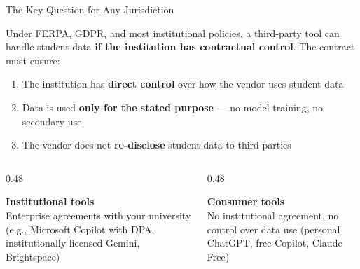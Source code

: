 \documentclass[aspectratio=169, 10pt]{beamer}
\begin{document}
\begin{frame}{The Key Question for Any Jurisdiction}

\begin{tcolorbox}[keybox, title={\faUniversity\quad Does Your Institution Have an Agreement with the AI Vendor?}]
\footnotesize
Under FERPA, GDPR, and most institutional policies, a third-party tool can handle student data \textbf{if the institution has contractual control}. The contract must ensure:
\begin{enumerate}\footnotesize
  \item The institution has \textbf{direct control} over how the vendor uses student data
  \item Data is used \textbf{only for the stated purpose} --- no model training, no secondary use
  \item The vendor does not \textbf{re-disclose} student data to third parties
\end{enumerate}
\end{tcolorbox}

\vspace{0.1cm}

\begin{columns}[T]
\begin{column}{0.48\textwidth}
\begin{tcolorbox}[accentbox]
\faCheckCircle\;\textbf{Institutional tools}\\[3pt]
\footnotesize Enterprise agreements with your university (e.g., Microsoft Copilot with DPA, institutionally licensed Gemini, Brightspace)
\end{tcolorbox}
\end{column}

\begin{column}{0.48\textwidth}
\begin{tcolorbox}[colback=SoftCoral!10, colframe=SoftCoral, boxrule=0.8pt, arc=3pt, left=6pt, right=6pt, top=4pt, bottom=4pt]
\faTimesCircle\;\textbf{Consumer tools}\\[3pt]
\footnotesize No institutional agreement, no control over data use (personal ChatGPT, free Copilot, Claude Free)
\end{tcolorbox}
\end{column}
\end{columns}

\end{frame}
\end{document}
